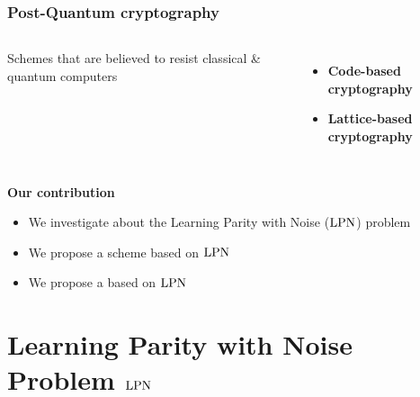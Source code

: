 \begin{frame}
\frametitle{Post-Quantum cryptography}
\begin{columns}[c]
Schemes that are believed to resist classical \& quantum computers
      \begin{itemize}
      \item \textbf{Code-based cryptography}
      \item \alert<2->{\textbf{Lattice-based cryptography}}
      \end{itemize} 
\end{columns}

 \vspace{10pt}
 \begin{block}{\textbf{Our contribution}}
 \begin{itemize}
  \item<2-> We investigate about the \alert{Learning Parity with Noise} ($\mathrm{LPN}$) problem
  \item<3-> We propose a {\color{blue}{Threshold Public-Key Encryption}} scheme based on $\mathrm{LPN}$
  \item<4-> We propose a {\color{blue}{Commitment protocol}} based on $\mathrm{LPN}$
 \end{itemize}

\end{block}

\end{frame}


\section{Learning Parity with Noise Problem $\mathrm{LPN}$}

